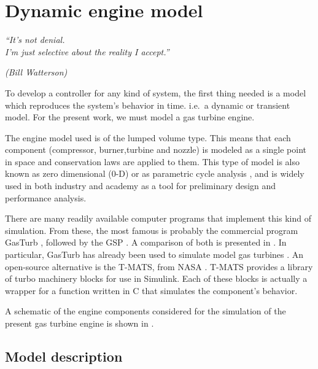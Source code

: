 \documentclass[tcc]{subfiles}
\begin{document}
\chapter{Dynamic engine model}
\label{ch:engine_model}
\epigraph{\em ``It's not denial.\\ I'm just selective about the reality I
accept.''}{\em(Bill Watterson)}

To develop a controller for any kind of system,
 the first thing needed is a model which reproduces the system's behavior in time.
 i.e.\ a dynamic or transient model.
 For the present work, we must model a gas turbine engine.

The engine model used is of the lumped volume type. This means that each component 
 (compressor, burner,turbine and nozzle)
 is modeled as a single point in space and conservation laws are applied to them.
 This type of model is also known as zero dimensional (0-D) or as parametric cycle analysis
 ,
 and is widely used in both industry and academy as a tool for preliminary design and 
 performance analysis. 

There are many readily available computer programs that implement this kind of simulation. 
From these, the most famous is probably the commercial program GasTurb \cite{GasTurb}, 
 
followed by the \gls{GSP} \cite{Visser2000}.
A comparison of both is presented in \textcite{GasTurbvsGSP}.
In particular, GasTurb has already been used to simulate model gas turbines 
 \cite{gao2011modelling}.
An open-source alternative is the \gls{T-MATS}, from NASA \cite{T-MATS}.
\gls{T-MATS} provides a library of turbo machinery blocks for use in Simulink. 
Each of these blocks is actually a wrapper for a function written in C 
 that simulates the component's behavior.

A schematic of the engine components considered for the simulation of the present gas turbine engine is shown in .

\section{Model description}
\end{document}
